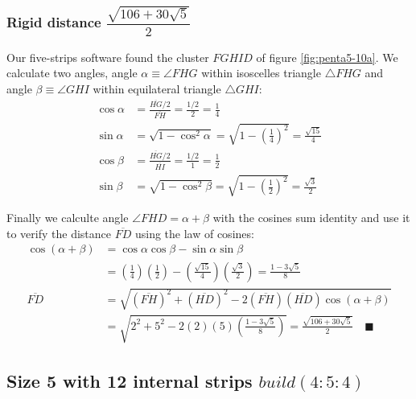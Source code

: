 \documentclass[11pt]{article}
\begin{document}
\subsubsection{Rigid distance $\dfrac{\sqrt{106 + 30\sqrt5}}2$}

Our five-strips software found the cluster $FGHID$ of figure \ref{fig:penta5-10a}. We calculate two angles, angle $\alpha \equiv \angle{FHG}$ within isoscelles triangle $\triangle{FHG}$ and angle $\beta \equiv \angle{GHI}$ within equilateral triangle $\triangle{GHI}$:
\begin{align}
\cos\alpha &= \frac{\overline{HG}/2}{\overline{FH}} = \frac{1/2}2 = \frac{1}4 \\
\sin\alpha &= \sqrt{1 - \cos^2\alpha} = \sqrt{1 - \left(\frac{1}4\right)^2} = \frac{\sqrt{15}}4\\
%
\cos\beta &= \frac{\overline{HG}/2}{\overline{HI}} = \frac{1/2}{1} = \frac{1}2 \\
\sin\beta &= \sqrt{1 - \cos^2\beta} = \sqrt{1 - \left(\frac{1}2\right)^2} = \frac{\sqrt{3}}2
\end{align}

Finally we calculte angle $\angle{FHD} = \alpha + \beta$ with the cosines sum identity and use it to verify the distance $\overline{FD}$ using the law of cosines:
\begin{align}
\cos(\alpha+\beta) &= \cos\alpha\cos\beta - \sin\alpha\sin\beta \nonumber\\
 &= \left(\frac{1}4\right)\left(\frac{1}2\right) 
  - \left(\frac{\sqrt{15}}4\right)\left(\frac{\sqrt{3}}2\right)
  = \frac{1 - 3\sqrt{5}}8 \\
\overline{FD} &= \sqrt{(\overline{FH})^2 + (\overline{HD})^2 
 - 2(\overline{FH})(\overline{HD})\cos(\alpha + \beta)} \nonumber\\
 &= \sqrt{2^2 + 5^2 - 2(2)(5)\left(\frac{1 - 3\sqrt{5}}8\right)}
 = \frac{\sqrt{106 + 30\sqrt5}}2 \quad \blacksquare
\end{align}


\subsection{Size 5 with 12 internal strips $build(4:5:4)$}
\end{document}
